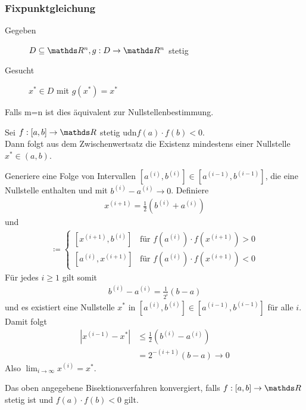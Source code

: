 \subsubsection{Fixpunktgleichung}
\begin{description}
	\item[Gegeben]   $D\subseteq \R^n, g: D\rightarrow \R^n$ stetig
	\item[Gesucht]      $x^{*}\in D $ mit $g(x^{*}) = x^{*}$
\end{description}
Falls m=n ist dies äquivalent zur Nullstellenbestimmung.

Sei $f:[a,b]\rightarrow \R $ stetig udn$f(a) \cdot f(b) <0$.\\
Dann folgt aus dem Zwischenwertsatz die Existenz
mindestens einer Nullstelle $x^{*}\in (a,b)$.

\label{im5.1.2}

Generiere eine Folge von Intervallen
$[a^{(i)}, b^{(i)}]\in  [a^{(i-1)}, b^{(i-1)}] $,
die eine Nullstelle enthalten und mit $b^{(i)}-a^{(i)} \longrightarrow 0$.
Definiere
\begin{gather}
x^{(i+1)}= \frac{1}{2}(b^{(i)}+a^{(i)})
\label{V.1.1}
\end{gather}
und
\begin{gather}
[a^{(i+1)}, b^{(i+1)}] \coloneqq \begin{cases}
[x^{(i+1)}, b^{(i)}] & \text{für } f(a^{(i)})\cdot f(x^{(i+1)}) > 0 \\
[a^{(i)}, x^{(i+1)}] & \text{für } f(a^{(i)})\cdot f(x^{(i+1)}) < 0
\end{cases}
\label{V.1.2}
\end{gather}
Für jedes $i\geq 1$ gilt somit
\begin{gather*}
b^{(i)}-a^{(i)} = \frac{1}{2^i}(b-a)
\end{gather*}
und es existiert eine Nullstelle $x^{*}$ in $[a^{(i)}, b^{(i)}]\in  [a^{(i-1)}, b^{(i-1)}] $
für alle $i$. \\
Damit folgt
\begin{align*}
|x^{(i-1)}-x^{*}| &\leq \frac{1}{2}(b^{(i)}-a^{(i)}) \\
&=  2^{-(i+1)} (b-a) \longrightarrow 0
\end{align*}
Also $\lim_{i\rightarrow \infty}x^{(i)} = x^{*}$.


\begin{Kore}
	Das oben angegebene Bisektionsverfahren konvergiert, falls
	$f:[a,b]\rightarrow \R $ stetig ist und 
	$f(a)\cdot f(b) <0$ gilt.
\end{Kore}

